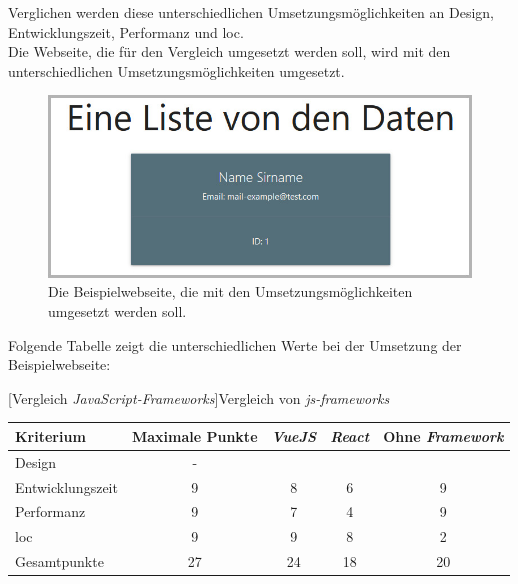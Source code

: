 Verglichen werden diese unterschiedlichen Umsetzungsmöglichkeiten an Design, Entwicklungszeit, Performanz und \Gls{loc}.\\
Die Webseite, die für den Vergleich umgesetzt werden soll, wird mit den unterschiedlichen Umsetzungsmöglichkeiten umgesetzt.\\
\begin{figure}[H]
	\centering
	\includegraphics[width=0.8\linewidth]{images/rfoster_study/example_page}
	\caption[Die Beispielwebseite]{Die Beispielwebseite, die mit den Umsetzungsmöglichkeiten umgesetzt werden soll.}
	\label{fig:example}
\end{figure}
Folgende Tabelle zeigt die unterschiedlichen Werte bei der Umsetzung der Beispielwebseite:
\begin{table}
	[Vergleich \textit{JavaScript-Frameworks}]{Vergleich von \textit{\Gls{js}-\Gls{framework}s}}\label{tab:vergleich}
	\centering
	\label{center}
	\begin{tabular}{l|c|c|c|c}
		Kriterium        & Maximale Punkte & \textit{VueJS} & \textit{React} & Ohne \textit{Framework}  \\\hline
		Design           & -                        &            \checkmark               &             \checkmark              &          \checkmark                           \\
		Entwicklungszeit & 9                         &             8              &               6            &               9                      \\
		Performanz       & 9                         &             7              &               4            &                 9                    \\
		\Gls{loc}              & 9                         &             9              &               8            &                   2                  \\
		Gesamtpunkte     & 27                         &              24             &               18            &                20                    
	\end{tabular}
\end{table}

